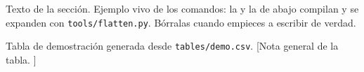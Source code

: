 Texto de la sección. Ejemplo vivo de los comandos: la  y la
 de abajo compilan y se expanden con \texttt{tools/flatten.py}.
Bórralas cuando empieces a escribir de verdad.


  {Tabla de demostración generada desde \texttt{tables/demo.csv}.}
  [Nota general de la tabla.
   ]

%
%
%
%
%
%
